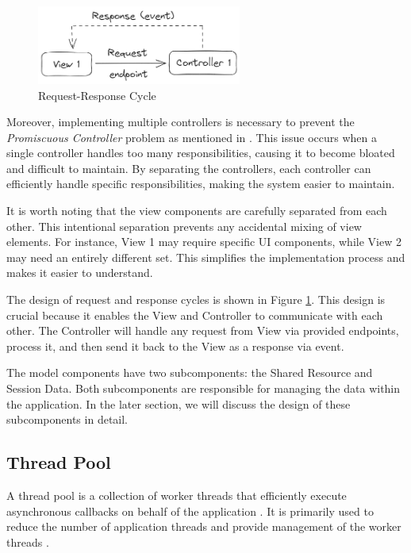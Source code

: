 \begin{figure}[!ht]
    \centering
    \includegraphics[width=0.6\textwidth]{texs/Part2/chapter3/image/reqres.png}
    \caption{Request-Response Cycle}
    \label{fig:reqres}
\end{figure}

Moreover, implementing multiple controllers is necessary to prevent the \textit{Promiscuous Controller} problem as mentioned in \cite[2127]{Aniche2017}. This issue occurs when a single controller handles too many responsibilities, causing it to become bloated and difficult to maintain. By separating the controllers, each controller can efficiently handle specific responsibilities, making the system easier to maintain.

It is worth noting that the view components are carefully separated from each other. This intentional separation prevents any accidental mixing of view elements. For instance, View 1 may require specific UI components, while View 2 may need an entirely different set. This simplifies the implementation process and makes it easier to understand.

The design of request and response cycles is shown in Figure \ref{fig:reqres}. This design is crucial because it enables the View and Controller to communicate with each other. The Controller will handle any request from View via provided endpoints, process it, and then send it back to the View as a response via event.

The model components have two subcomponents: the Shared Resource and Session Data. Both subcomponents are responsible for managing the data within the application. In the later section, we will discuss the design of these subcomponents in detail.

\subsection{Thread Pool}
\label{subsec:thread-pool}

A thread pool is a collection of worker threads that efficiently execute asynchronous callbacks on behalf of the application \cite{Karl-Bridge-Microsoft}. It is primarily used to reduce the number of application threads and provide management of the worker threads \cite{Karl-Bridge-Microsoft}.

